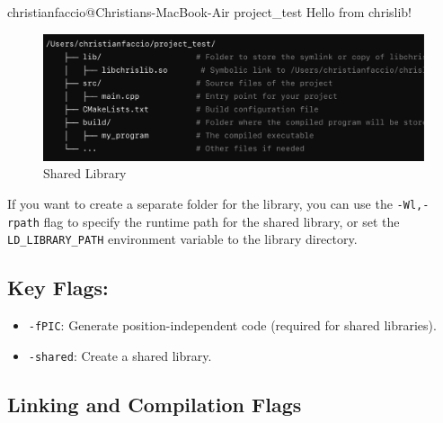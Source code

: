 \begin{codeblock}[language=bash]
christianfaccio@Christians-MacBook-Air project_test %
Hello from chrislib!
\end{codeblock}

\begin{figure}
    \centering
    \includegraphics[width=\textwidth]{assets/dynamic_proj_dir.png}
    \caption{Shared Library}
\end{figure}

\begin{observationblock}
    If you want to create a separate folder for the library, you can use the \texttt{-Wl,-rpath} flag to specify the runtime path for the shared library, or set the \texttt{LD\_LIBRARY\_PATH} environment variable to the library directory.
\end{observationblock}

\subsection*{Key Flags:}
\begin{itemize}
    \item \texttt{-fPIC}: Generate position-independent code (required for shared libraries).
    \item \texttt{-shared}: Create a shared library.
\end{itemize}

\subsection*{Linking and Compilation Flags}


